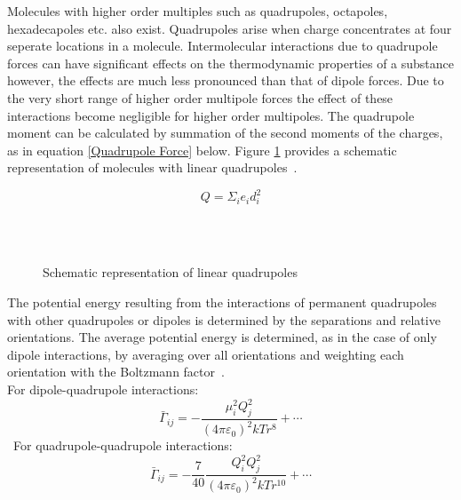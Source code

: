 Molecules with higher order multiples such as quadrupoles, octapoles, hexadecapoles etc. also exist. Quadrupoles arise when charge concentrates at four seperate locations in a molecule. Intermolecular interactions due to quadrupole forces can have significant effects on the thermodynamic properties of a substance however, the effects are much less pronounced than that of dipole forces. Due to the very short range of higher order multipole forces the effect of these interactions become negligible for higher order multipoles. The quadrupole moment can be calculated by summation of the second moments of the charges, as in equation \ref{Quadrupole Force} below. Figure \ref{QuadrupoleDrawing} provides a schematic representation of molecules with linear quadrupoles~\cite{MolecularThermodynamicsOfFluidPhaseEquilibria}.\

\begin{equation}
Q = \Sigma_{i} \mathit{e}_{i} d_{i}^{2} \label{Quadrupole Force}
\end{equation}\


\begin{figure}
\begin{center}
\resizebox{0.8\textwidth}{!}{}\\
\end{center}
\caption{Schematic representation of linear quadrupoles} \label{QuadrupoleDrawing}
\end{figure}

The potential energy resulting from the interactions of permanent quadrupoles with other quadrupoles or dipoles is determined by the separations and relative orientations. The average potential energy is determined, as in the case of only dipole interactions, by averaging over all orientations and weighting each orientation with the Boltzmann factor~\cite{MolecularThermodynamicsOfFluidPhaseEquilibria}.\\

For dipole-quadrupole interactions:\
\begin{equation}
\bar{\Gamma}_{ij} = - \frac{\mu_{i}^{2} Q_{j}^{2}}{\left(4\pi\varepsilon_{0}\right)^{2}kTr^{8}} +\cdots \label{Dipole-Quad Potential Average}
\end{equation}\
For quadrupole-quadrupole interactions:\
\begin{equation}
\bar{\Gamma}_{ij} = -\frac{7}{40} \frac{Q_{i}^{2} Q_{j}^{2}}{\left(4\pi\varepsilon_{0}\right)^{2}kTr^{10}} +\cdots \label{Quadrupole-Quad Potential Average}
\end{equation}\


